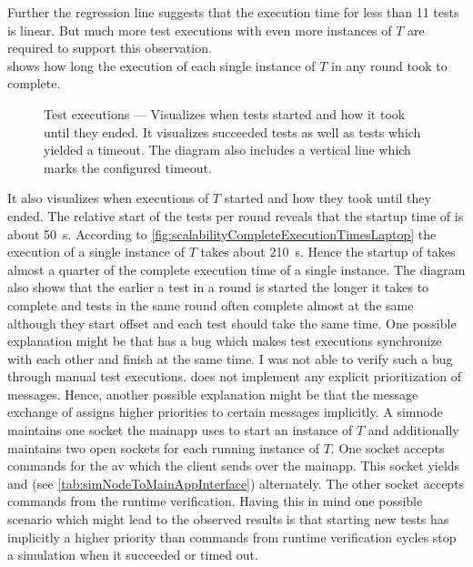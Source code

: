 Further the regression line suggests that the execution time for less than \num{11} tests is linear.
But much more test executions with even more instances of \(T\) are required to support this observation.\\
 shows how long the execution of each single instance of \(T\) in any round took to complete.
\begin{figure}
    
    \medskip
    \caption{%
        Test executions --- Visualizes when tests started and how it took until they ended.
        It visualizes succeeded tests as well as tests which yielded a timeout.
        The diagram also includes a vertical line which marks the configured timeout.
    }\label{fig:scalabilityExecutionTimesLaptop}
\end{figure}
It also visualizes when executions of \(T\) started and how they took until they ended.
The relative start of the tests per round reveals that the startup time of \beamng{} is about \SI{50}{\second}.
According to \cref{fig:scalabilityCompleteExecutionTimesLaptop} the execution of a single instance of \(T\) takes about \SI{210}{\second}.
Hence the startup of \beamng{} takes almost a quarter of the complete execution time of a single instance.
The diagram also shows that the earlier a test in a round is started the longer it takes to complete and tests in the same round often complete almost at the same although they start offset and each test should take the same time.
One possible explanation might be that \drivebuild{} has a bug which \eg{} makes test executions synchronize with each other and finish at the same time.
I was not able to verify such a bug through manual test executions.
\drivebuild{} does not implement any explicit prioritization of messages.
Hence, another possible explanation might be that the message exchange of \drivebuild{} assigns higher priorities to certain messages implicitly.
A \gls{simnode} maintains one socket the \gls{mainapp} uses to start an instance of \(T\) and additionally maintains two open sockets for each running instance of \(T\).
One socket accepts commands for the \gls{av} which the client sends over the \gls{mainapp}.
This socket yields  and  (see \cref{tab:simNodeToMainAppInterface}) alternately.
The other socket accepts commands from the runtime verification.
Having this in mind one possible scenario which might lead to the observed results is that starting new tests has implicitly a higher priority than commands from runtime verification cycles \eg{} stop a simulation when it succeeded or timed out.

